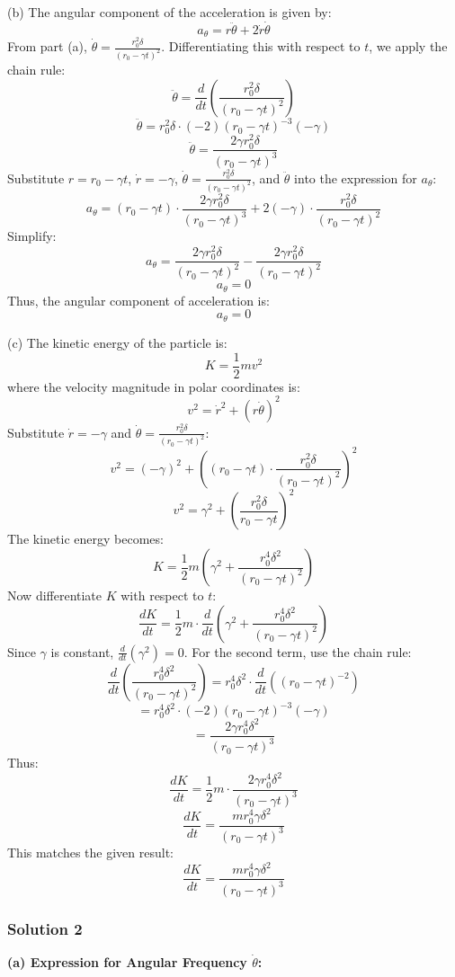 \documentclass{article}
\begin{document}
(b) The angular component of the acceleration is given by:
\[
a_\theta = r \ddot{\theta} + 2 \dot{r} \dot{\theta}
\]
From part (a), \( \dot{\theta} = \frac{r_0^2 \delta}{(r_0 - \gamma t)^2} \). Differentiating this with respect to \( t \), we apply the chain rule:
\[
\ddot{\theta} = \frac{d}{dt} \left( \frac{r_0^2 \delta}{(r_0 - \gamma t)^2} \right)
\]
\[
\ddot{\theta} = r_0^2 \delta \cdot (-2) (r_0 - \gamma t)^{-3} (-\gamma)
\]
\[
\ddot{\theta} = \frac{2 \gamma r_0^2 \delta}{(r_0 - \gamma t)^3}
\]
Substitute \( r = r_0 - \gamma t \), \( \dot{r} = -\gamma \), \( \dot{\theta} = \frac{r_0^2 \delta}{(r_0 - \gamma t)^2} \), and \( \ddot{\theta} \) into the expression for \( a_\theta \):
\[
a_\theta = (r_0 - \gamma t) \cdot \frac{2 \gamma r_0^2 \delta}{(r_0 - \gamma t)^3} + 2 (-\gamma) \cdot \frac{r_0^2 \delta}{(r_0 - \gamma t)^2}
\]
Simplify:
\[
a_\theta = \frac{2 \gamma r_0^2 \delta}{(r_0 - \gamma t)^2} - \frac{2 \gamma r_0^2 \delta}{(r_0 - \gamma t)^2}
\]
\[
a_\theta = 0
\]
Thus, the angular component of acceleration is:
\[
\boxed{a_\theta = 0}
\]

(c) The kinetic energy of the particle is:
\[
K = \frac{1}{2} m v^2
\]
where the velocity magnitude in polar coordinates is:
\[
v^2 = \dot{r}^2 + (r \dot{\theta})^2
\]
Substitute \( \dot{r} = -\gamma \) and \( \dot{\theta} = \frac{r_0^2 \delta}{(r_0 - \gamma t)^2} \):
\[
v^2 = (-\gamma)^2 + \left( (r_0 - \gamma t) \cdot \frac{r_0^2 \delta}{(r_0 - \gamma t)^2} \right)^2
\]
\[
v^2 = \gamma^2 + \left( \frac{r_0^2 \delta}{r_0 - \gamma t} \right)^2
\]
The kinetic energy becomes:
\[
K = \frac{1}{2} m \left( \gamma^2 + \frac{r_0^4 \delta^2}{(r_0 - \gamma t)^2} \right)
\]
Now differentiate \( K \) with respect to \( t \):
\[
\frac{dK}{dt} = \frac{1}{2} m \cdot \frac{d}{dt} \left( \gamma^2 + \frac{r_0^4 \delta^2}{(r_0 - \gamma t)^2} \right)
\]
Since \( \gamma \) is constant, \( \frac{d}{dt}(\gamma^2) = 0 \). For the second term, use the chain rule:
\[
\frac{d}{dt} \left( \frac{r_0^4 \delta^2}{(r_0 - \gamma t)^2} \right) = r_0^4 \delta^2 \cdot \frac{d}{dt} \left( (r_0 - \gamma t)^{-2} \right)
\]
\[
= r_0^4 \delta^2 \cdot (-2)(r_0 - \gamma t)^{-3}(-\gamma)
\]
\[
= \frac{2 \gamma r_0^4 \delta^2}{(r_0 - \gamma t)^3}
\]
Thus:
\[
\frac{dK}{dt} = \frac{1}{2} m \cdot \frac{2 \gamma r_0^4 \delta^2}{(r_0 - \gamma t)^3}
\]
\[
\frac{dK}{dt} = \frac{m r_0^4 \gamma \delta^2}{(r_0 - \gamma t)^3}
\]
This matches the given result:
\[
\boxed{\frac{dK}{dt} = \frac{m r_0^4 \gamma \delta^2}{(r_0 - \gamma t)^3}}
\]

\subsubsection{Solution 2}
\textbf{(a) Expression for Angular Frequency \( \dot{\theta} \):}
\end{document}
